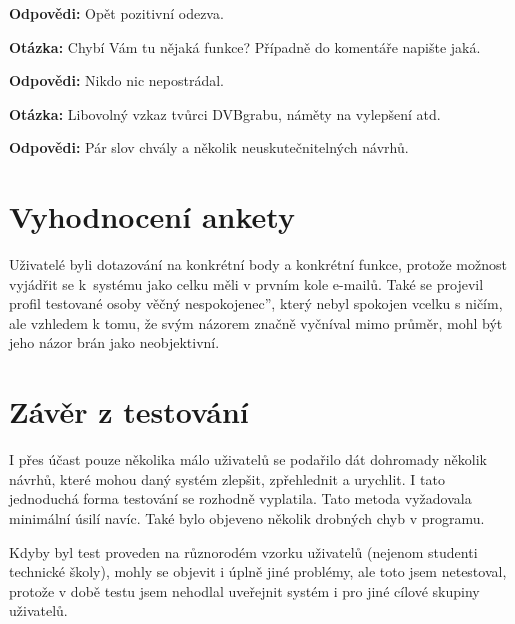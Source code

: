 \textbf{Odpovědi:} Opět pozitivní odezva.
						
\bigskip

\textbf{Otázka:} Chybí Vám tu nějaká funkce? Případně do komentáře napište jaká.

\textbf{Odpovědi:} Nikdo nic nepostrádal.
				
\bigskip

\textbf{Otázka:} Libovolný vzkaz tvůrci DVBgrabu, náměty na vylepšení atd.

\textbf{Odpovědi:} Pár slov chvály a několik neuskutečnitelných návrhů.

\bigskip

\section{Vyhodnocení ankety}

Uživatelé byli dotazování na konkrétní body a konkrétní funkce, protože možnost vyjádřit se k~systému jako celku měli v prvním kole e-mailů. Také se projevil profil testované osoby \quotedblbase věčný nespokojenec'', který nebyl spokojen vcelku s ničím, ale vzhledem k tomu, že svým názorem značně vyčníval mimo průměr, mohl být jeho názor brán jako neobjektivní.

\bigskip

\section{Závěr z testování}

I přes účast pouze několika málo uživatelů se podařilo dát dohromady několik návrhů, které mohou daný systém zlepšit, zpřehlednit a urychlit. I tato jednoduchá forma testování se rozhodně vyplatila. Tato metoda vyžadovala minimální úsilí navíc. Také bylo objeveno několik drobných chyb v programu.

\bigskip

Kdyby byl test proveden na různorodém vzorku uživatelů (nejenom studenti technické školy), mohly se objevit i úplně jiné problémy, ale toto jsem netestoval, protože v době testu jsem nehodlal uveřejnit systém i pro jiné cílové skupiny uživatelů.
